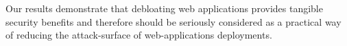 Our results demonstrate that debloating web applications
provides tangible security benefits and therefore should be seriously
considered as a practical way of reducing the attack-surface of
web-applications deployments.


